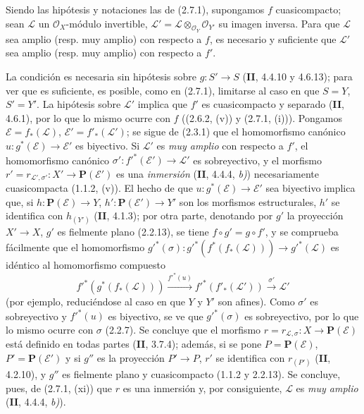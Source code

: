 \begin{corollary}[2.7.2]
\label{IV.2.7.2-fr}
Siendo las hipótesis y notaciones las de \textup{(2.7.1)}, supongamos $f$
cuasicompacto; sean $\mathcal L$ un $\mathcal O_X$-módulo invertible,
$\mathcal L'=\mathcal L\otimes_{\mathcal O_Y}\mathcal O_{Y'}$ su imagen
inversa. Para que $\mathcal L$ sea amplio \textup{(resp.} muy amplio\textup{)} con respecto a
$f$, es necesario y suficiente que $\mathcal L'$ sea amplio \textup{(resp.} muy
amplio\textup{)} con respecto a $f'$.
\end{corollary}

La condición es necesaria sin hipótesis sobre $g:S'\to S$ (\textbf{II}, 4.4.10 y
4.6.13); para ver que es suficiente, es posible, como en (2.7.1), limitarse al
caso en que $S=Y$, $S'=Y'$. La hipótesis sobre $\mathcal L'$ implica que
$f'$ es cuasicompacto y separado (\textbf{II}, 4.6.1), por lo que lo mismo ocurre con
$f$ ((2.6.2, (v)) y (2.7.1, (i))). Pongamos
$\mathcal E=f_*(\mathcal L)$, $\mathcal E'=f'_*(\mathcal L')$; se sigue de
(2.3.1) que el homomorfismo canónico
$u:g^*(\mathcal E)\to\mathcal E'$ es biyectivo. Si $\mathcal L'$ es \emph{muy
amplio} con respecto a $f'$, el homomorfismo canónico
$\sigma':f'^*(\mathcal E')\to\mathcal L'$ es sobreyectivo, y el morfismo
$r'=r_{\mathcal L',\sigma'}:X'\to\mathbf P(\mathcal E')$
es una \emph{inmersión} (\textbf{II}, 4.4.4, \emph{b)}) necesariamente cuasicompacta (1.1.2,
(v)). El hecho de que $u:g^*(\mathcal E)\to\mathcal E'$ sea biyectivo
implica que, si $h:\mathbf P(\mathcal E)\to Y$,
$h':\mathbf P(\mathcal E')\to Y'$ son los morfismos estructurales, $h'$ se
identifica con $h_{(Y')}$ (\textbf{II}, 4.1.3); por otra parte, denotando por $g'$ la
proyección $X'\to X$, $g'$ es fielmente plano (2.2.13), se tiene
$f\circ g'=g\circ f'$, y se comprueba fácilmente que el homomorfismo
$g'^*(\sigma):g'^*(f^*(f_*(\mathcal L)))\to g'^*(\mathcal L)$
es idéntico al homomorfismo compuesto
\[
f'^*(g^*(f_*(\mathcal L)))\xrightarrow{f'^*(u)}
f'^*(f'_*(\mathcal L'))\xrightarrow{\sigma'}\mathcal L'
\]
(por ejemplo, reduciéndose al caso en que $Y$ y $Y'$ son afines). Como
$\sigma'$ es sobreyectivo y $f'^*(u)$ es biyectivo, se ve que
$g'^*(\sigma)$ es sobreyectivo, por lo que lo mismo ocurre con $\sigma$
(2.2.7). Se concluye que el morfismo
$r=r_{\mathcal L,\sigma}:X\to\mathbf P(\mathcal E)$ está definido en todas
partes (\textbf{II}, 3.7.4); además, si se pone $P=\mathbf P(\mathcal E)$,
$P'=\mathbf P(\mathcal E')$ y si $g''$ es la proyección $P'\to P$, $r'$ se
identifica con $r_{(P')}$ (\textbf{II}, 4.2.10), y $g''$ es fielmente plano y
cuasicompacto (1.1.2 y 2.2.13). Se concluye, pues, de (2.7.1, (xi)) que $r$
es una inmersión y, por consiguiente, $\mathcal L$ es \emph{muy amplio} (\textbf{II}, 4.4.4,
\emph{b)}).

